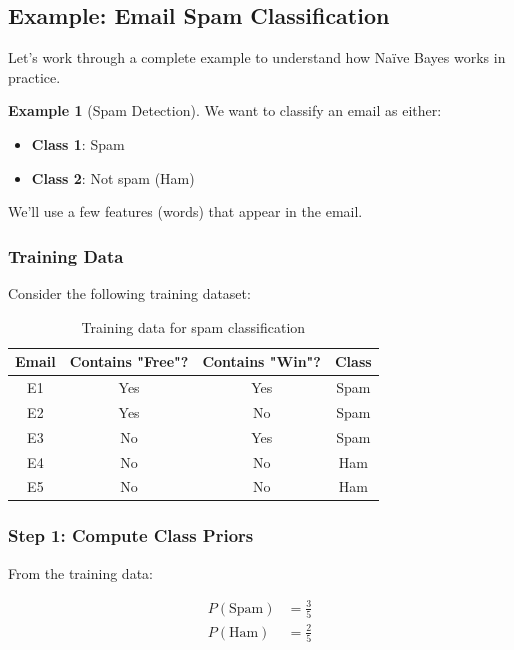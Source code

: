 \documentclass[11pt,a4paper]{article}
\theoremstyle{definition}
\newtheorem{example}{Example}[section]
\theoremstyle{plain}
\theoremstyle{remark}
\begin{document}
\subsection{Example: Email Spam Classification}

Let's work through a complete example to understand how Naïve Bayes works in practice.

\begin{example}[Spam Detection]
We want to classify an email as either:
\begin{itemize}
    \item \textbf{Class 1}: Spam
    \item \textbf{Class 2}: Not spam (Ham)
\end{itemize}

We'll use a few features (words) that appear in the email.
\end{example}

\subsubsection{Training Data}

Consider the following training dataset:

\begin{table}[h]
\centering
\begin{tabular}{|c|c|c|c|}
\hline
\textbf{Email} & \textbf{Contains "Free"?} & \textbf{Contains "Win"?} & \textbf{Class} \\
\hline
E1 & Yes & Yes & Spam \\
E2 & Yes & No & Spam \\
E3 & No & Yes & Spam \\
E4 & No & No & Ham \\
E5 & No & No & Ham \\
\hline
\end{tabular}
\caption{Training data for spam classification}
\end{table}

\subsubsection{Step 1: Compute Class Priors}

From the training data:

\begin{align}
P(\text{Spam}) &= \frac{3}{5} \\
P(\text{Ham}) &= \frac{2}{5}
\end{align}
\end{document}
